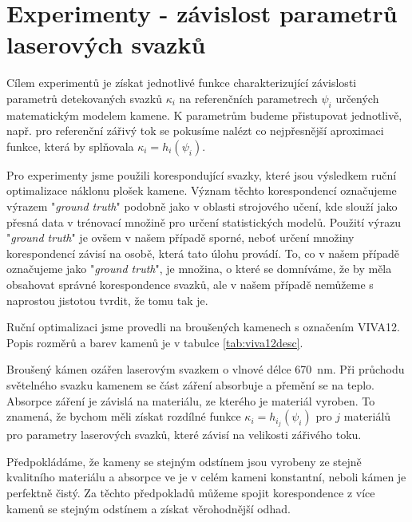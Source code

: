 \section*{Experimenty - závislost parametrů laserových svazků}

Cílem experimentů je získat jednotlivé funkce charakterizující závislosti parametrů detekovaných svazků $\kappa_i$ na referenčních parametrech $\psi_i$ určených matematickým modelem kamene. K parametrům budeme přistupovat jednotlivě, např. pro referenční zářivý tok se pokusíme nalézt co nejpřesnější aproximaci funkce, která by splňovala $\kappa_i = h_i\left(\psi_i\right)$.

Pro experimenty jsme použili korespondující svazky, které jsou výsledkem ruční optimalizace náklonu plošek kamene. Význam těchto korespondencí označujeme výrazem "\textit{ground truth}" podobně jako v oblasti strojového učení, kde slouží jako přesná data v trénovací množině pro určení statistických modelů. Použití výrazu "\textit{ground truth}" je ovšem v našem případě sporné, neboť určení množiny korespondencí závisí na osobě, která tato úlohu provádí. To, co v našem případě označujeme jako "\textit{ground truth}", je množina, o které se domníváme, že by měla obsahovat správné korespondence svazků, ale v našem případě nemůžeme s naprostou jistotou tvrdit, že tomu tak je. 

Ruční optimalizaci jsme provedli na broušených kamenech s označením VIVA12. Popis rozměrů a barev kamenů je v tabulce \ref{tab:viva12desc}. 

Broušený kámen ozářen laserovým svazkem o vlnové délce \SI{670}{\nano\metre}. Při průchodu světelného svazku kamenem se část záření absorbuje a přemění se na teplo. Absorpce záření je závislá na materiálu, ze kterého je materiál vyroben. To znamená, že bychom měli získat rozdílné funkce $\kappa_i = h_i_j\left(\psi_i\right)$ pro $j$ materiálů pro parametry laserových svazků, které závisí na velikosti zářivého toku. 

Předpokládáme, že kameny se stejným odstínem jsou vyrobeny ze stejně kvalitního materiálu a absorpce ve je v celém kameni konstantní, neboli kámen je perfektně čistý. Za těchto předpokladů můžeme spojit korespondence z více kamenů se stejným odstínem a získat věrohodnější odhad.    

